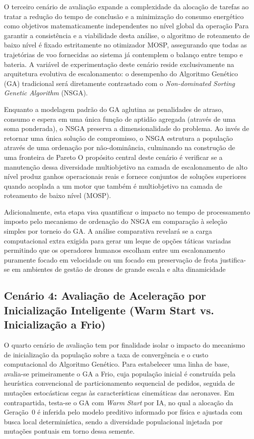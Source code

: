 O terceiro cenário de avaliação expande a complexidade da alocação de tarefas ao tratar a redução do tempo de conclusão e a minimização do consumo energético como objetivos matematicamente independentes no nível global da operação %
Para garantir a consistência e a viabilidade desta análise, o algoritmo de roteamento de baixo nível é fixado estritamente no otimizador MOSP, assegurando que todas as trajetórias de voo fornecidas ao sistema já contemplem o balanço entre tempo e bateria.
A variável de experimentação deste cenário reside exclusivamente na arquitetura evolutiva de escalonamento: o desempenho do Algoritmo Genético (GA) tradicional será diretamente contrastado com o \textit{Non-dominated Sorting Genetic Algorithm} (NSGA).

Enquanto a modelagem padrão do GA aglutina as penalidades de atraso, consumo e espera em uma única função de aptidão agregada (através de uma soma ponderada), o NSGA preserva a dimensionalidade do problema.
Ao invés de retornar uma única solução de compromisso, o NSGA estrutura a população através de uma ordenação por não-dominância, culminando na construção de uma fronteira de Pareto %
O propósito central deste cenário é verificar se a manutenção dessa diversidade multiobjetivo na camada de escalonamento de alto nível produz ganhos operacionais reais e fornece conjuntos de soluções superiores quando acoplada a um motor que também é multiobjetivo na camada de roteamento de baixo nível (MOSP).

Adicionalmente, esta etapa visa quantificar o impacto no tempo de processamento imposto pelo mecanismo de ordenação do NSGA em comparação à seleção simples por torneio do GA.
A análise comparativa revelará se a carga computacional extra exigida para gerar um leque de opções táticas variadas permitindo que os operadores humanos escolham entre um escalonamento puramente focado em velocidade ou um focado em preservação de frota justifica-se em ambientes de gestão de drones de grande escala e alta dinamicidade %



\subsection{Cenário 4: Avaliação de Aceleração por Inicialização Inteligente (Warm Start vs. Inicialização a Frio)}
\label{sec:cenario4}

O quarto cenário de avaliação tem por finalidade isolar o impacto do mecanismo de inicialização da população sobre a taxa de convergência e o custo computacional do Algoritmo Genético. Para estabelecer uma linha de base, avalia-se primeiramente o GA a Frio, cuja população inicial é construída pela heurística convencional de particionamento sequencial de pedidos, seguida de mutações estocásticas cegas às características cinemáticas das aeronaves. Em contrapartida, testa-se o GA com \textit{Warm Start} por IA, no qual a alocação da Geração~0 é inferida pelo modelo preditivo informado por física e ajustada com busca local determinística, sendo a diversidade populacional injetada por mutações pontuais em torno dessa semente.

